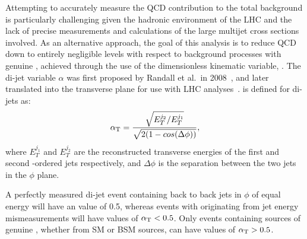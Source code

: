 Attempting to accurately measure the QCD contribution to the total background is
particularly challenging given the hadronic environment of the LHC and the lack
of precise measurements and calculations of the large multijet cross sections
involved. As an
alternative approach, the goal of this analysis is to reduce QCD down to
entirely negligible levels with respect to background processes with genuine
\met, achieved through the use of the dimensionless kinematic
variable, \alphat. The di-jet variable
$\alpha$ was first proposed by Randall et al.\ in 2008~\cite{Randall:2008rw},
and later translated into the transverse plane for use with LHC
analyses~\cite{CMS:2008vya, CMS-PAS-SUS-09-001}.
\alphat is defined for di-jets as:
% 
\begin{equation}
\alpha_{\text{T}} = \frac{ \sqrt{E_T^{j_2}/E_T^{j_1}} }{ \sqrt{2(1-cos(\Delta \phi))} } ,
\label{eq:alphat_di-jet}
\end{equation}
% 
where $E_T^{j_1}$ and $E_T^{j_2}$ are the reconstructed transverse energies of 
the first and second \Pt-ordered jets respectively, and $\Delta \phi$ is the separation 
between the two jets in the $\phi$ plane.

A perfectly measured di-jet event containing back to back jets in $\phi$ of equal energy will
have an \alphat value of 0.5, whereas 
events with \met originating from jet energy mismeasurements will have values of $\alpha_{\text{T}}<0.5$.
Only events containing sources of genuine \met, whether from SM or BSM sources,
can have values of $\alpha_{\text{T}} > 0.5$.
% 
% 
% 
% 

